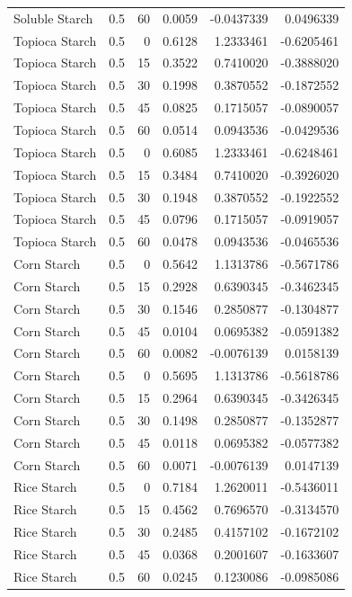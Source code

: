 \documentclass[
  12pt,
]{article}
\begin{document}
{\begin{longtable}[]{@{}lrrrrr@{}}
Soluble Starch & 0.5 & 60 & 0.0059 & -0.0437339 & 0.0496339 \\
Topioca Starch & 0.5 & 0 & 0.6128 & 1.2333461 & -0.6205461 \\
Topioca Starch & 0.5 & 15 & 0.3522 & 0.7410020 & -0.3888020 \\
Topioca Starch & 0.5 & 30 & 0.1998 & 0.3870552 & -0.1872552 \\
Topioca Starch & 0.5 & 45 & 0.0825 & 0.1715057 & -0.0890057 \\
Topioca Starch & 0.5 & 60 & 0.0514 & 0.0943536 & -0.0429536 \\
Topioca Starch & 0.5 & 0 & 0.6085 & 1.2333461 & -0.6248461 \\
Topioca Starch & 0.5 & 15 & 0.3484 & 0.7410020 & -0.3926020 \\
Topioca Starch & 0.5 & 30 & 0.1948 & 0.3870552 & -0.1922552 \\
Topioca Starch & 0.5 & 45 & 0.0796 & 0.1715057 & -0.0919057 \\
Topioca Starch & 0.5 & 60 & 0.0478 & 0.0943536 & -0.0465536 \\
Corn Starch & 0.5 & 0 & 0.5642 & 1.1313786 & -0.5671786 \\
Corn Starch & 0.5 & 15 & 0.2928 & 0.6390345 & -0.3462345 \\
Corn Starch & 0.5 & 30 & 0.1546 & 0.2850877 & -0.1304877 \\
Corn Starch & 0.5 & 45 & 0.0104 & 0.0695382 & -0.0591382 \\
Corn Starch & 0.5 & 60 & 0.0082 & -0.0076139 & 0.0158139 \\
Corn Starch & 0.5 & 0 & 0.5695 & 1.1313786 & -0.5618786 \\
Corn Starch & 0.5 & 15 & 0.2964 & 0.6390345 & -0.3426345 \\
Corn Starch & 0.5 & 30 & 0.1498 & 0.2850877 & -0.1352877 \\
Corn Starch & 0.5 & 45 & 0.0118 & 0.0695382 & -0.0577382 \\
Corn Starch & 0.5 & 60 & 0.0071 & -0.0076139 & 0.0147139 \\
Rice Starch & 0.5 & 0 & 0.7184 & 1.2620011 & -0.5436011 \\
Rice Starch & 0.5 & 15 & 0.4562 & 0.7696570 & -0.3134570 \\
Rice Starch & 0.5 & 30 & 0.2485 & 0.4157102 & -0.1672102 \\
Rice Starch & 0.5 & 45 & 0.0368 & 0.2001607 & -0.1633607 \\
Rice Starch & 0.5 & 60 & 0.0245 & 0.1230086 & -0.0985086 \\

\end{longtable}}
\end{document}
